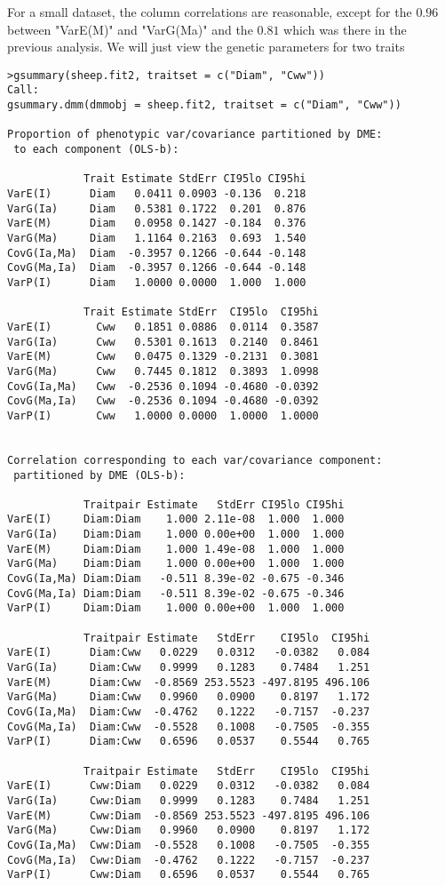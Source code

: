 \documentclass[titlepage]{article}  %
\begin{document}
 For a small dataset, the column correlations are reasonable, except for the $0.96$ between "VarE(M)" and "VarG(Ma)" and the $0.81$ which was there in the previous analysis. We will just view the genetic parameters for two traits

\begin{verbatim}
>gsummary(sheep.fit2, traitset = c("Diam", "Cww"))
Call:
gsummary.dmm(dmmobj = sheep.fit2, traitset = c("Diam", "Cww"))

Proportion of phenotypic var/covariance partitioned by DME:
 to each component (OLS-b):

            Trait Estimate StdErr CI95lo CI95hi
VarE(I)      Diam   0.0411 0.0903 -0.136  0.218
VarG(Ia)     Diam   0.5381 0.1722  0.201  0.876
VarE(M)      Diam   0.0958 0.1427 -0.184  0.376
VarG(Ma)     Diam   1.1164 0.2163  0.693  1.540
CovG(Ia,Ma)  Diam  -0.3957 0.1266 -0.644 -0.148
CovG(Ma,Ia)  Diam  -0.3957 0.1266 -0.644 -0.148
VarP(I)      Diam   1.0000 0.0000  1.000  1.000

            Trait Estimate StdErr  CI95lo  CI95hi
VarE(I)       Cww   0.1851 0.0886  0.0114  0.3587
VarG(Ia)      Cww   0.5301 0.1613  0.2140  0.8461
VarE(M)       Cww   0.0475 0.1329 -0.2131  0.3081
VarG(Ma)      Cww   0.7445 0.1812  0.3893  1.0998
CovG(Ia,Ma)   Cww  -0.2536 0.1094 -0.4680 -0.0392
CovG(Ma,Ia)   Cww  -0.2536 0.1094 -0.4680 -0.0392
VarP(I)       Cww   1.0000 0.0000  1.0000  1.0000


Correlation corresponding to each var/covariance component:
 partitioned by DME (OLS-b):

            Traitpair Estimate   StdErr CI95lo CI95hi
VarE(I)     Diam:Diam    1.000 2.11e-08  1.000  1.000
VarG(Ia)    Diam:Diam    1.000 0.00e+00  1.000  1.000
VarE(M)     Diam:Diam    1.000 1.49e-08  1.000  1.000
VarG(Ma)    Diam:Diam    1.000 0.00e+00  1.000  1.000
CovG(Ia,Ma) Diam:Diam   -0.511 8.39e-02 -0.675 -0.346
CovG(Ma,Ia) Diam:Diam   -0.511 8.39e-02 -0.675 -0.346
VarP(I)     Diam:Diam    1.000 0.00e+00  1.000  1.000

            Traitpair Estimate   StdErr    CI95lo  CI95hi
VarE(I)      Diam:Cww   0.0229   0.0312   -0.0382   0.084
VarG(Ia)     Diam:Cww   0.9999   0.1283    0.7484   1.251
VarE(M)      Diam:Cww  -0.8569 253.5523 -497.8195 496.106
VarG(Ma)     Diam:Cww   0.9960   0.0900    0.8197   1.172
CovG(Ia,Ma)  Diam:Cww  -0.4762   0.1222   -0.7157  -0.237
CovG(Ma,Ia)  Diam:Cww  -0.5528   0.1008   -0.7505  -0.355
VarP(I)      Diam:Cww   0.6596   0.0537    0.5544   0.765

            Traitpair Estimate   StdErr    CI95lo  CI95hi
VarE(I)      Cww:Diam   0.0229   0.0312   -0.0382   0.084
VarG(Ia)     Cww:Diam   0.9999   0.1283    0.7484   1.251
VarE(M)      Cww:Diam  -0.8569 253.5523 -497.8195 496.106
VarG(Ma)     Cww:Diam   0.9960   0.0900    0.8197   1.172
CovG(Ia,Ma)  Cww:Diam  -0.5528   0.1008   -0.7505  -0.355
CovG(Ma,Ia)  Cww:Diam  -0.4762   0.1222   -0.7157  -0.237
VarP(I)      Cww:Diam   0.6596   0.0537    0.5544   0.765


\end{verbatim}
\end{document}
